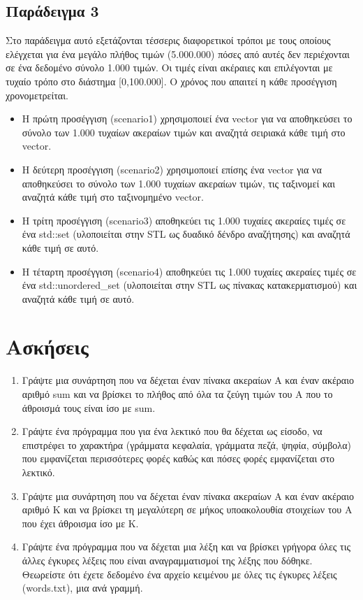 \subsection{Παράδειγμα 3}
Στο παράδειγμα αυτό εξετάζονται τέσσερις διαφορετικοί τρόποι με τους οποίους ελέγχεται για ένα μεγάλο πλήθος τιμών (5.000.000) πόσες από αυτές δεν περιέχονται σε ένα δεδομένο σύνολο 1.000 τιμών. Οι τιμές είναι ακέραιες και επιλέγονται με τυχαίο τρόπο στο διάστημα [0,100.000]. Ο χρόνος που απαιτεί η κάθε προσέγγιση χρονομετρείται.
\begin{itemize}[noitemsep]
\item Η πρώτη προσέγγιση (scenario1) χρησιμοποιεί ένα vector για να αποθηκεύσει το σύνολο των 1.000 τυχαίων ακεραίων τιμών και αναζητά σειριακά κάθε τιμή στο vector. 
\item Η δεύτερη προσέγγιση (scenario2) χρησιμοποιεί επίσης ένα vector για να αποθηκεύσει το σύνολο των 1.000 τυχαίων ακεραίων τιμών, τις ταξινομεί και αναζητά κάθε τιμή στο ταξινομημένο vector. 
\item Η τρίτη προσέγγιση (scenario3) αποθηκεύει τις 1.000 τυχαίες ακεραίες τιμές σε ένα std::set (υλοποιείται στην STL ως δυαδικό δένδρο αναζήτησης) και αναζητά κάθε τιμή σε αυτό. 
\item Η τέταρτη προσέγγιση (scenario4) αποθηκεύει τις 1.000 τυχαίες ακεραίες τιμές σε ένα std::unordered\_set (υλοποιείται στην STL ως πίνακας κατακερματισμού) και αναζητά κάθε τιμή σε αυτό.
\end{itemize}





\section{Ασκήσεις}
\begin{enumerate}
\item Γράψτε μια συνάρτηση που να δέχεται έναν πίνακα ακεραίων Α και έναν ακέραιο αριθμό sum και να βρίσκει το πλήθος από όλα τα ζεύγη τιμών του Α που το άθροισμά τους είναι ίσο με sum.
\item Γράψτε ένα πρόγραμμα που για ένα λεκτικό που θα δέχεται ως είσοδο, να επιστρέφει το χαρακτήρα (γράμματα κεφαλαία, γράμματα πεζά, ψηφία, σύμβολα) που εμφανίζεται περισσότερες φορές καθώς και πόσες φορές εμφανίζεται στο λεκτικό.
\item Γράψτε μια συνάρτηση που να δέχεται έναν πίνακα ακεραίων Α και έναν ακέραιο αριθμό Κ και να βρίσκει τη μεγαλύτερη σε μήκος υποακολουθία στοιχείων του Α που έχει άθροισμα ίσο με Κ.
\item Γράψτε ένα πρόγραμμα που να δέχεται μια λέξη και να βρίσκει γρήγορα όλες τις άλλες έγκυρες λέξεις που είναι αναγραμματισμοί της λέξης που δόθηκε. Θεωρείστε ότι έχετε δεδομένο ένα αρχείο κειμένου με όλες τις έγκυρες λέξεις (words.txt), μια ανά γραμμή.
\end{enumerate}

